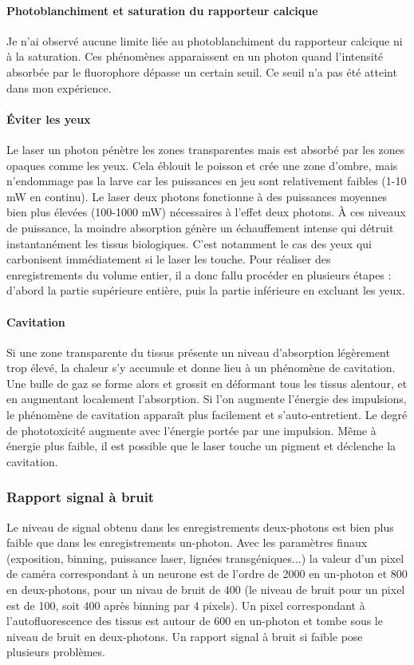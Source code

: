 \paragraph{Photoblanchiment et saturation du rapporteur calcique}
Je n'ai observé aucune limite liée au photoblanchiment du rapporteur calcique ni à la saturation. Ces phénomènes apparaissent en un photon quand l'intensité absorbée par le fluorophore dépasse un certain seuil. Ce seuil n'a pas été atteint dans mon expérience.

\paragraph{Éviter les yeux}
Le laser un photon pénètre les zones transparentes mais est absorbé par les zones opaques comme les yeux. Cela éblouit le poisson et crée une zone d'ombre, mais n'endommage pas la larve car les puissances en jeu sont relativement faibles (1-10 mW en continu). Le laser deux photons fonctionne à des puissances moyennes bien plus élevées (100-1000 mW) nécessaires à l'effet deux photons. À ces niveaux de puissance, la moindre absorption génère un échauffement intense qui détruit instantanément les tissus biologiques. C'est notamment le cas des yeux qui carbonisent immédiatement si le laser les touche. Pour réaliser des enregistrements du volume entier, il a donc fallu procéder en plusieurs étapes : d'abord la partie supérieure entière, puis la partie inférieure en excluant les yeux. 

\paragraph{Cavitation}
Si une zone transparente du tissus présente un niveau d'absorption légèrement trop élevé, la chaleur s'y accumule et donne lieu à un phénomène de cavitation. Une bulle de gaz se forme alors et grossit en déformant tous les tissus alentour, et en augmentant localement l'absorption. Si l'on augmente l'énergie des impulsions, le phénomène de cavitation apparaît plus facilement et s'auto-entretient. Le degré de phototoxicité augmente avec l'énergie portée par une impulsion. Même à énergie plus faible, il est possible que le laser touche un pigment et déclenche la cavitation.

\subsubsection{Rapport signal à bruit}
Le niveau de signal obtenu dans les enregistrements deux-photons est bien plus faible que dans les enregistrements un-photon. Avec les paramètres finaux (exposition, binning, puissance laser, lignées transgéniques...) la valeur d'un pixel de caméra correspondant à un neurone est de l'ordre de 2000 en un-photon et 800 en deux-photons, pour un nivau de bruit de 400 (le niveau de bruit pour un pixel est de 100, soit 400 après binning par 4 pixels). Un pixel correspondant à l'autofluorescence des tissus est autour de 600 en un-photon et tombe sous le niveau de bruit en deux-photons. Un rapport signal à bruit si faible pose plusieurs problèmes.
